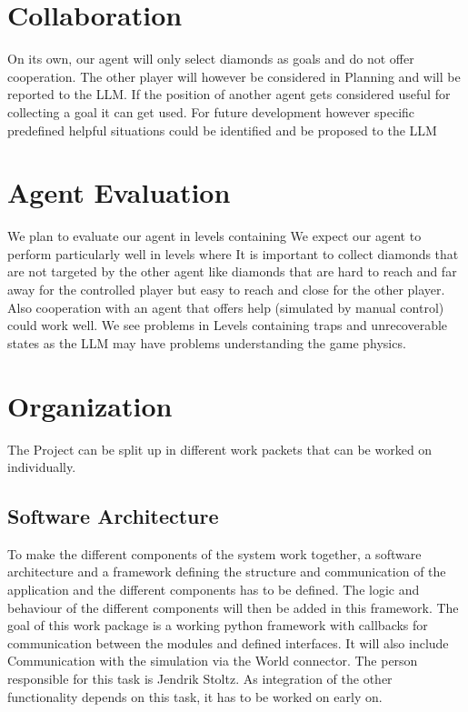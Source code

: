\documentclass{article}
\begin{document}
\section{Collaboration}

On its own, our agent will only select diamonds as goals and do not offer cooperation. The other player will however be considered in Planning and will be reported to the LLM. If the position of another agent gets considered useful for collecting a goal it can get used. For future development however specific predefined helpful situations could be identified and be proposed to the LLM

\section{Agent Evaluation}

We plan to evaluate our agent in levels containing 
We expect our agent to perform particularly well in levels where It is important to collect diamonds that are not targeted by the other agent like diamonds that are hard to reach and far away for the controlled player but easy to reach and close for the other player. Also cooperation with an agent that offers help (simulated by manual control) could work well. We see problems in Levels containing traps and unrecoverable states as the LLM may have problems understanding the game physics.

\section{Organization}

The Project can be split up in different work packets that can be worked on individually.

\subsection{Software Architecture}
To make the different components of the system work together, a software architecture and a framework defining the structure and communication of the application and the different components has to be defined. 
The logic and behaviour of the different components will then be added in this framework. 
The goal of this work package is a working python framework with callbacks for communication between the modules and defined interfaces. 
It will also include Communication with the simulation via the World connector. The person responsible for this task is Jendrik Stoltz. 
As integration of the other functionality depends on this task, it has to be worked on early on.
\end{document}
